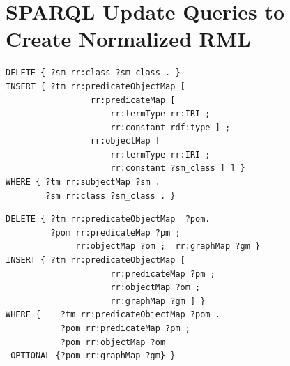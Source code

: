 \appendix

\section{SPARQL Update Queries to Create Normalized RML}
\label{appdx:queries}

\vspace{-2mm}

\noindent
	\begin{minipage}[t]{0.44\textwidth}
		{
		\fontsize{6}{6.5}
		\begin{verbatim}
DELETE { ?sm rr:class ?sm_class . }
INSERT { ?tm rr:predicateObjectMap [
                 rr:predicateMap [
                     rr:termType rr:IRI ;
                     rr:constant rdf:type ] ;
                 rr:objectMap [
                     rr:termType rr:IRI ;
                     rr:constant ?sm_class ] ] }
WHERE { ?tm rr:subjectMap ?sm . 
        ?sm rr:class ?sm_class . }
		\end{verbatim}
		}
		\vspace{-3mm}
	\end{minipage}%
    \hfill%
    \begin{minipage}[t]{0.52\textwidth}
        {
        \fontsize{6}{6.5}
        \begin{verbatim}
DELETE { ?tm rr:predicateObjectMap  ?pom. 
         ?pom rr:predicateMap ?pm ;
              rr:objectMap ?om ;  rr:graphMap ?gm }
INSERT { ?tm rr:predicateObjectMap [
                     rr:predicateMap ?pm ;
                     rr:objectMap ?om ; 
                     rr:graphMap ?gm ] }
WHERE {    ?tm rr:predicateObjectMap ?pom .
           ?pom rr:predicateMap ?pm ;
           ?pom rr:objectMap ?om
 OPTIONAL {?pom rr:graphMap ?gm} } 
        \end{verbatim}
        }
        \vspace{-5mm}
    \end{minipage}

